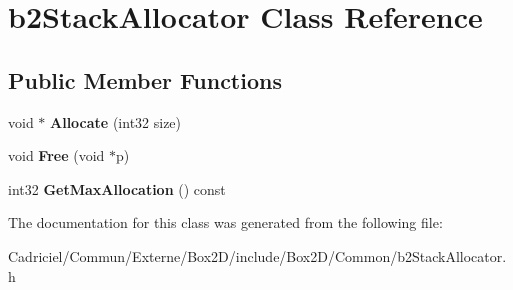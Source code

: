 \hypertarget{classb2_stack_allocator}{}\section{b2\+Stack\+Allocator Class Reference}
\label{classb2_stack_allocator}
\subsection*{Public Member Functions}
\begin{DoxyCompactItemize}
\item 
void $\ast$ {\bfseries Allocate} (int32 size)\hypertarget{classb2_stack_allocator_a3319923944404ab8bad447db0e00d391}{}\label{classb2_stack_allocator_a3319923944404ab8bad447db0e00d391}

\item 
void {\bfseries Free} (void $\ast$p)\hypertarget{classb2_stack_allocator_a3a4384cf5f467828db3022985673db66}{}\label{classb2_stack_allocator_a3a4384cf5f467828db3022985673db66}

\item 
int32 {\bfseries Get\+Max\+Allocation} () const \hypertarget{classb2_stack_allocator_a1530b6889eaa679ab1b0e092e4911366}{}\label{classb2_stack_allocator_a1530b6889eaa679ab1b0e092e4911366}

\end{DoxyCompactItemize}


The documentation for this class was generated from the following file\+:\begin{DoxyCompactItemize}
\item 
Cadriciel/\+Commun/\+Externe/\+Box2\+D/include/\+Box2\+D/\+Common/b2\+Stack\+Allocator.\+h\end{DoxyCompactItemize}
